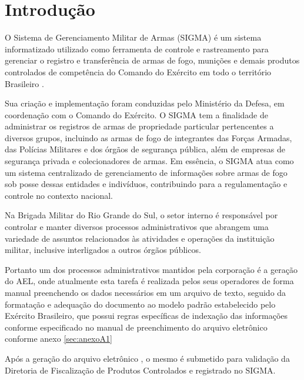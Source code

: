 \chapter{Introdução}

O Sistema de Gerenciamento Militar de Armas (SIGMA) é um sistema informatizado utilizado como ferramenta de controle e rastreamento para gerenciar o registro e transferência de armas de fogo, munições e demais produtos controlados de competência do Comando do Exército em todo o território Brasileiro 
\cite{ExércitoBrasileiro}.

Sua criação e implementação foram conduzidas pelo Ministério da Defesa, em coordenação com o Comando do Exército. O SIGMA tem a finalidade de administrar os registros de armas de propriedade particular pertencentes a diversos grupos, incluindo as armas de fogo de integrantes das Forças Armadas, das Polícias Militares e dos órgãos de segurança pública, além de empresas de segurança privada e colecionadores de armas. Em essência, o SIGMA atua como um sistema centralizado de gerenciamento de informações sobre armas de fogo sob posse dessas entidades e indivíduos, contribuindo para a regulamentação e controle no contexto nacional.
\cite{ExércitoBrasileiro}


Na Brigada Militar do Rio Grande do Sul, o setor interno é responsável por controlar e 
manter diversos processos administrativos que abrangem uma variedade de assuntos relacionados às atividades e operações da instituição militar, inclusive interligados a outros órgãos públicos. 
\cite{bmDepartamentoAdministrativo}

Portanto um dos processos administrativos mantidos pela corporação é a geração do AEL, onde atualmente esta tarefa é realizada pelos seus operadores de forma manual preenchendo os dados necessários em um arquivo de texto, seguido da formatação e adequação do documento ao modelo padrão estabelecido pelo Exército Brasileiro, que possui regras específicas de indexação das informações conforme especificado no manual de preenchimento do arquivo eletrônico conforme anexo \ref{sec:anexoA1}




Após a geração do arquivo eletrônico , o mesmo é submetido para validação da Diretoria de Fiscalização de Produtos Controlados e registrado no SIGMA.


